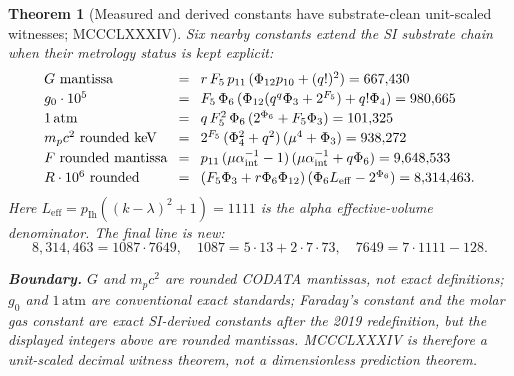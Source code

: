 \documentclass[11pt]{article}
\newtheorem{theorem}{Theorem}[section]
\begin{document}
\begin{theorem}[Measured and derived constants have substrate-clean unit-scaled witnesses; MCCCLXXXIV]\label{thm:measured_derived_constants}
Six nearby constants extend the SI substrate chain when their metrology
status is kept explicit:
\[\setlength{\arraycolsep}{4pt}\begin{array}{lcl}
  G\ \text{mantissa} &=& r\,F_5\,p_{11}\,(\Phi_{12}p_{10}+(q!)^2) = 667{,}430 \\[2pt]
  g_0\cdot10^5 &=& F_5\,\Phi_6\,(\Phi_{12}(q^q\Phi_3+2^{F_5})+q!\Phi_4) = 980{,}665 \\[2pt]
  1\,\mathrm{atm} &=& q\,F_5^2\,\Phi_6\,(2^{\Phi_6}+F_5\Phi_3) = 101{,}325 \\[2pt]
  m_pc^2\ \text{rounded keV} &=& 2^{F_5}\,(\Phi_4^2+q^2)\,(\mu^4+\Phi_3) = 938{,}272 \\[2pt]
  F\ \text{rounded mantissa} &=& p_{11}\,(\mu\alpha^{-1}_{\mathrm{int}}-1)\,(\mu\alpha^{-1}_{\mathrm{int}}+q\Phi_6) = 9{,}648{,}533 \\[2pt]
  R\cdot10^6\ \text{rounded} &=& (F_5\Phi_3+r\Phi_6\Phi_{12})\,(\Phi_6L_{\mathrm{eff}}-2^{\Phi_6}) = 8{,}314{,}463 .
\end{array}\]
Here $L_{\mathrm{eff}}=p_{\mathrm{Ih}}((k-\lambda)^2+1)=1111$ is the
alpha effective-volume denominator.  The final line is new:
\[
  8{,}314{,}463 = 1087\cdot7649,\quad
  1087=5\cdot13+2\cdot7\cdot73,\quad
  7649=7\cdot1111-128.
\]

\textbf{Boundary.}  $G$ and $m_pc^2$ are rounded CODATA mantissas,
not exact definitions; $g_0$ and $1\,\mathrm{atm}$ are conventional exact
standards; Faraday's constant and the molar gas constant are exact
SI-derived constants after the 2019 redefinition, but the displayed
integers above are rounded mantissas.  MCCCLXXXIV is therefore a
unit-scaled decimal witness theorem, not a dimensionless prediction theorem.
\end{theorem}
\end{document}
